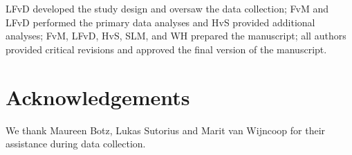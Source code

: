 \documentclass[authordate, empirical, issue]{jote-new-article}
\begin{document}
LFvD developed the study design and oversaw the data collection; FvM and LFvD performed the primary data analyses and HvS provided additional analyses; FvM, LFvD, HvS, SLM, and WH prepared the manuscript; all authors provided critical revisions and approved the final version of the manuscript.


\section{Acknowledgements}



We thank Maureen Botz, Lukas Sutorius and Marit van Wijncoop for their assistance during data collection.


\printbibliography


















\end{document}
